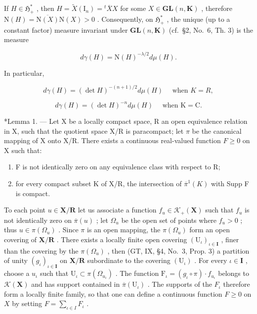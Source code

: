 If \(H \in \mathfrak{H}_+^*\) , then \(H = \widetilde{X}(\mathrm{I}_n) = {}^t\overline{X}X\) for some \(X \in \mathbf{GL}(n,\mathbf{K})\) , therefore \(\mathrm{N}(H) = \overline{\mathrm{N}(X)}\mathrm{N}(X) > 0\) . Consequently, on \(\mathfrak{H}_+^*\) , the unique (up to a constant factor) measure invariant under \(\mathbf{GL}(n,\mathbf{K})\) (cf.~§2, No.~6, Th. 3) is the measure

\[
d \gamma (H) = \mathrm{N} (H) ^ {- \lambda / 2} d \mu (H).
\]

In particular,

\[
d \gamma (H) = (\det H) ^ {- (n + 1) / 2} d \mu (H) \quad \text { when } K = R,
\]

\[
d \gamma (H) = (\det H) ^ {- n} d \mu (H) \quad \text { when } \mathrm{K} = \mathrm{C}.
\]

\appendixheading

*Lemma 1. --- Let X be a locally compact space, R an open equivalence relation in X, such that the quotient space X/R is paracompact; let \(\pi\) be the canonical mapping of X onto X/R. There exists a continuous real-valued function \(F \geqslant 0\) on X such that:

\begin{enumerate}
\def\labelenumi{\alph{enumi})}
\item
  F is not identically zero on any equivalence class with respect to R;
\item
  for every compact subset K of X/R, the intersection of \(\overline{\pi}^{1}(K)\) with Supp F is compact.
\end{enumerate}

To each point \(u \in \mathbf{X} / \mathbf{R}\) let us associate a function \(f_{u} \in \mathcal{K}_{+}(\mathbf{X})\) such that \(f_{u}\) is not identically zero on \(\overline{\pi}(u)\) ; let \(\Omega_{u}\) be the open set of points where \(f_{u} > 0\) ; thus \(u \in \pi(\Omega_{u})\) . Since \(\pi\) is an open mapping, the \(\pi(\Omega_{u})\) form an open covering of \(\mathbf{X} / \mathbf{R}\) . There exists a locally finite open covering \((\mathrm{U}_{\iota})_{\iota \in \mathbf{I}}\) , finer than the covering by the \(\pi(\Omega_{u})\) , then (GT, IX, §4, No.~3, Prop. 3) a partition of unity \((g_{\iota})_{\iota \in \mathbf{I}}\) on \(\mathbf{X} / \mathbf{R}\) subordinate to the covering \((\mathrm{U}_{\iota})\) . For every \(\iota \in \mathbf{I}\) , choose a \(u_{\iota}\) such that \(\mathrm{U}_{\iota} \subset \pi(\Omega_{u_{\iota}})\) . The function \(\mathrm{F}_{\iota} = (g_{\iota} \circ \pi) \cdot f_{u_{\iota}}\) belongs to \(\mathcal{K}(\mathbf{X})\) and has support contained in \(\overline{\pi}(\mathrm{U}_{\iota})\) . The supports of the \(F_{\iota}\) therefore form a locally finite family, so that one can define a continuous function \(F \geqslant 0\) on \(X\) by setting \(F = \sum_{\iota \in I} F_{\iota}\) .

